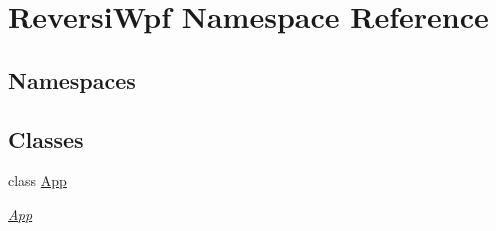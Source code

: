 \hypertarget{namespace_reversi_wpf}{}\section{Reversi\+Wpf Namespace Reference}
\label{namespace_reversi_wpf}
\subsection*{Namespaces}
\begin{DoxyCompactItemize}
\end{DoxyCompactItemize}
\subsection*{Classes}
\begin{DoxyCompactItemize}
\item 
class \hyperlink{class_reversi_wpf_1_1_app}{App}
\begin{DoxyCompactList}\small\item\em \hyperlink{class_reversi_wpf_1_1_app}{App} \end{DoxyCompactList}\end{DoxyCompactItemize}
